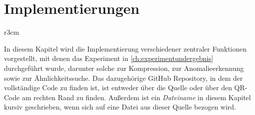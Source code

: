 \chapter{Implementierungen}
\begin{wrapfigure}{r}{3cm}
    \centering
\end{wrapfigure}

In diesem Kapitel wird die Implementierung verschiedener zentraler Funktionen vorgestellt, mit denen das Experiment in \autoref{ch:experimentundergebnis} durchgeführt wurde, darunter solche zur Kompression, zur Anomalieerkennung sowie zur Ähnlichkeitssuche. Das dazugehörige GitHub Repository, in dem der vollständige Code zu finden ist, ist entweder über die Quelle \cite{g2025} oder über den QR-Code am rechten Rand zu finden. Außerdem ist ein \textit{Dateiname} in diesem Kapitel kursiv geschrieben, wenn sich auf eine Datei aus dieser Quelle bezogen wird. 



